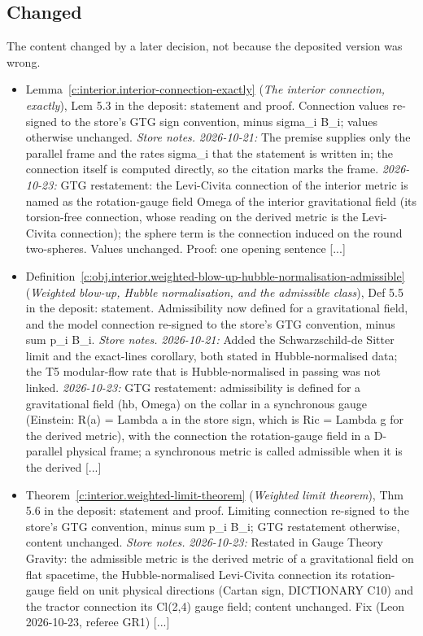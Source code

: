 \documentclass[11pt]{article}
\theoremstyle{definition}
\theoremstyle{plain}
\begin{document}
\subsection*{Changed}
The content changed by a later decision, not because the deposited version was wrong.
\begin{itemize}\setlength{\itemsep}{2pt}
\item Lemma~\ref{c:interior.interior-connection-exactly} (\emph{The interior connection, exactly}), Lem 5.3 in the deposit: statement and proof. Connection values re-signed to the store's GTG sign convention, minus sigma\_i B\_i; values otherwise unchanged. \emph{Store notes.} \emph{2026-10-21:} The premise supplies only the parallel frame and the rates sigma\_i that the statement is written in; the connection itself is computed directly, so the citation marks the frame. \emph{2026-10-23:} GTG restatement: the Levi-Civita connection of the interior metric is named as the rotation-gauge field Omega of the interior gravitational field (its torsion-free connection, whose reading on the derived metric is the Levi-Civita connection); the sphere term is the connection induced on the round two-spheres. Values unchanged. Proof: one opening sentence [...]
\item Definition~\ref{c:obj.interior.weighted-blow-up-hubble-normalisation-admissible} (\emph{Weighted blow-up, Hubble normalisation, and the admissible class}), Def 5.5 in the deposit: statement. Admissibility now defined for a gravitational field, and the model connection re-signed to the store's GTG convention, minus sum p\_i B\_i. \emph{Store notes.} \emph{2026-10-21:} Added the Schwarzschild-de Sitter limit and the exact-lines corollary, both stated in Hubble-normalised data; the T5 modular-flow rate that is Hubble-normalised in passing was not linked. \emph{2026-10-23:} GTG restatement: admissibility is defined for a gravitational field (hb, Omega) on the collar in a synchronous gauge (Einstein: R(a) = Lambda a in the store sign, which is Ric = Lambda g for the derived metric), with the connection the rotation-gauge field in a D-parallel physical frame; a synchronous metric is called admissible when it is the derived [...]
\item Theorem~\ref{c:interior.weighted-limit-theorem} (\emph{Weighted limit theorem}), Thm 5.6 in the deposit: statement and proof. Limiting connection re-signed to the store's GTG convention, minus sum p\_i B\_i; GTG restatement otherwise, content unchanged. \emph{Store notes.} \emph{2026-10-23:} Restated in Gauge Theory Gravity: the admissible metric is the derived metric of a gravitational field on flat spacetime, the Hubble-normalised Levi-Civita connection its rotation-gauge field on unit physical directions (Cartan sign, DICTIONARY C10) and the tractor connection its Cl(2,4) gauge field; content unchanged. Fix (Leon 2026-10-23, referee GR1) [...]

\end{itemize}
\end{document}
